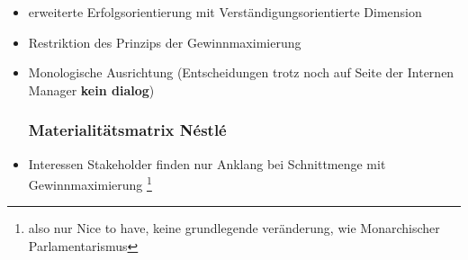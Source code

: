 \begin{itemize}
    \item erweiterte Erfolgsorientierung mit Verständigungsorientierte Dimension
    \item Restriktion des Prinzips der Gewinnmaximierung
    \item Monologische Ausrichtung (Entscheidungen trotz noch auf Seite der Internen Manager \textbf{kein dialog})
\subsubsection{Materialitätsmatrix Néstlé}
\item Interessen Stakeholder finden nur Anklang bei Schnittmenge mit Gewinnmaximierung \footnote{also nur Nice to have, keine grundlegende veränderung, wie Monarchischer Parlamentarismus}
\end{itemize}
